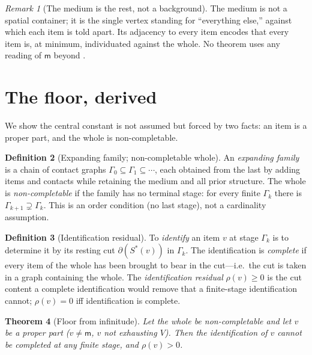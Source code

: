 \documentclass[twocolumn,11pt,a4paper]{article}
\theoremstyle{sup}
\newtheorem{theorem}{Theorem}[section]
\theoremstyle{definition}
\newtheorem{definition}[theorem]{Definition}
\theoremstyle{remark}
\newtheorem{remark}[theorem]{Remark}
\newcommand{\Gph}{\Gamma}
\newcommand{\V}{V}
\newcommand{\med}{\mathsf{m}}
\newcommand{\cut}{\partial}
\newcommand{\res}{\rho}
\begin{document}
\begin{remark}[The medium is the rest, not a background]
\label{rem:medium}
The medium is not a spatial container; it is the single vertex standing for
``everything else,'' against which each item is told apart. Its adjacency to
every item encodes that every item is, at minimum, individuated against the
whole. No theorem uses any reading of $\med$ beyond .
\end{remark}

\section{The floor, derived}
\label{sec:floor}

We show the central constant is not assumed but forced by two facts: an item is
a proper part, and the whole is non-completable.

\begin{definition}[Expanding family; non-completable whole]
\label{def:noncompletable}
An \emph{expanding family} is a chain of contact graphs
$\Gph_0\subseteq\Gph_1\subseteq\cdots$, each obtained from the last by adding
items and contacts while retaining the medium and all prior structure. The whole
is \emph{non-completable} if the family has no terminal stage: for every finite
$\Gph_k$ there is $\Gph_{k+1}\supsetneq\Gph_k$. This is an order condition (no
last stage), not a cardinality assumption.
\end{definition}

\begin{definition}[Identification residual]
\label{def:residual}
To \emph{identify} an item $v$ at stage $\Gph_k$ is to determine it by its
resting cut $\cut(S^\ast(v))$ in $\Gph_k$. The identification is \emph{complete}
if every item of the whole has been brought to bear in the cut---i.e.\ the cut
is taken in a graph containing the whole. The \emph{identification residual}
$\res(v)\ge0$ is the cut content a complete identification would remove that a
finite-stage identification cannot; $\res(v)=0$ iff identification is complete.
\end{definition}

\begin{theorem}[Floor from infinitude]
\label{thm:floor-derived}
Let the whole be non-completable and let $v$ be a proper part ($v\neq\med$, $v$
not exhausting $\V$). Then the identification of $v$ cannot be completed at any
finite stage, and $\res(v)>0$.
\end{theorem}
\end{document}
